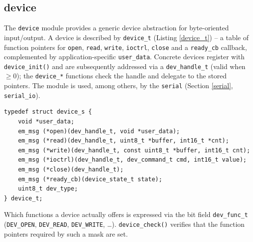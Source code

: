 \subsection{device}\label{device}
The \verb|device| module provides a generic device abstraction for
byte-oriented input/output. A device is described by \verb|device_t| (Listing
\ref{device_t}) -- a table of function pointers for \verb|open|, \verb|read|,
\verb|write|, \verb|ioctrl|, \verb|close| and a \verb|ready_cb| callback,
complemented by application-specific \verb|user_data|. Concrete devices
register with \verb|device_init()| and are subsequently addressed via a
\verb|dev_handle_t| (valid when $\ge 0$); the \verb|device_*| functions check
the handle and delegate to the stored pointers. The module is used, among
others, by the \verb|serial| (Section \ref{serial}, \verb|serial_io|).

\begin{listing}
\begin{verbatim}
typedef struct device_s {
    void *user_data;
    em_msg (*open)(dev_handle_t, void *user_data);
    em_msg (*read)(dev_handle_t, uint8_t *buffer, int16_t *cnt);
    em_msg (*write)(dev_handle_t, const uint8_t *buffer, int16_t cnt);
    em_msg (*ioctrl)(dev_handle_t, dev_command_t cmd, int16_t value);
    em_msg (*close)(dev_handle_t);
    em_msg (*ready_cb)(device_state_t state);
    uint8_t dev_type;
} device_t;
\end{verbatim}
\caption{Device interface \texttt{device\_t}}
\label{device_t}
\end{listing}

\noindent Which functions a device actually offers is expressed via the bit
field \verb|dev_func_t| (\verb|DEV_OPEN|, \verb|DEV_READ|, \verb|DEV_WRITE|,
\dots). \verb|device_check()| verifies that the function pointers required by
such a mask are set.

